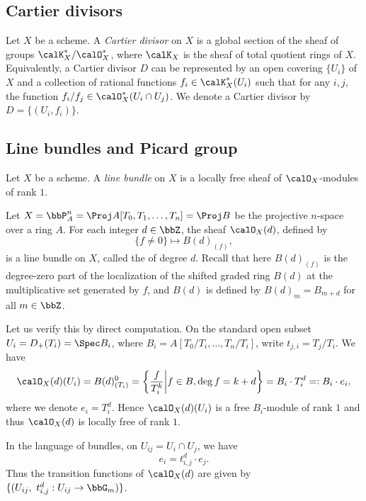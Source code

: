 \subsection{Cartier divisors}

    \begin{definition}\label{def:Cartier_divisor}
        Let \(X\) be a scheme. 
        A \emph{Cartier divisor} on \(X\) is a global section of the sheaf of groups \(\calK_X^*/\calO_X^*\), where \(\calK_X\) is the sheaf of total quotient rings of \(X\).
        Equivalently, a Cartier divisor \(D\) can be represented by an open covering \(\{U_i\}\) of \(X\) and a collection of rational functions \(f_i \in \calK_X^*(U_i)\) such that for any \(i, j\), the function \(f_i/f_j \in \calO_X^*(U_i \cap U_j)\).
        We denote a Cartier divisor by \(D = \{(U_i, f_i)\}\).
    \end{definition}

\subsection{Line bundles and Picard group}

    \begin{definition}\label{def:line_bundle}
        Let \(X\) be a scheme.
        A \emph{line bundle} on \(X\) is a locally free sheaf of \(\calO_X\)-modules of rank \(1\).
    \end{definition}
    \begin{example}\label{eg:twisted_line_bundle_O_n_on_projective_scheme}
        Let \(X = \bbP^n_A = \Proj A[T_0, T_1, \ldots, T_n] = \Proj B\) be the projective \(n\)-space over a ring \(A\).
        For each integer \(d \in \bbZ\), the sheaf \(\calO_X(d)\), defined by
        \[ \{ f \neq 0 \} \mapsto B(d)_{(f)}, \]
        is a line bundle on \(X\), called the  of degree \(d\).
        Recall that here \(B(d)_{(f)}\) is the degree-zero part of the localization of the shifted graded ring \(B(d)\) at the multiplicative set generated by \(f\), 
        and \(B(d)\) is defined by \(B(d)_m = B_{m+d}\) for all \(m \in \bbZ\).

        Let us verify this by direct computation.
        On the standard open subset \(U_i = D_+(T_i) = \Spec B_i\), where \(B_i = A\left[T_0/T_i, \ldots, T_n/T_i\right]\), write \(t_{j,i} = T_j/T_i\).
        We have 
        \[ \calO_X(d)(U_i) = B(d)_{(T_i)}^0 = \left\{ \frac{f}{T_i^k} \middle| f \in B, \deg f = k+d \right\} = B_i \cdot T_i^d =: B_i \cdot e_i, \]
        where we denote \(e_i = T_i^d\).
        Hence \(\calO_X(d)(U_i)\) is a free \(B_i\)-module of rank \(1\) and thus \(\calO_X(d)\) is locally free of rank \(1\).

        In the language of bundles, on \(U_{ij} = U_i \cap U_j\), we have 
        \[ e_i = t_{i,j}^d \cdot e_j. \]
        Thus the transition functions of \(\calO_X(d)\) are given by \(\{(U_{ij},\ t_{i,j}^d:U_{ij} \to \bbG_m)\}\).
    \end{example}

